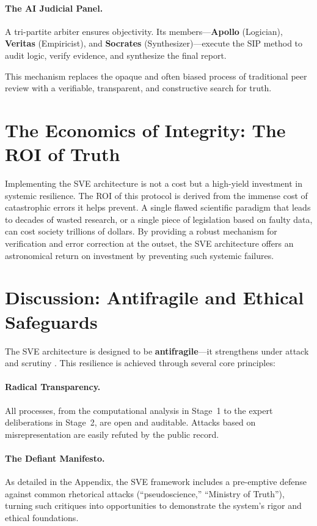 \documentclass[11pt,a4paper]{article}
\theoremstyle{definition}
\begin{document}
\paragraph{The AI Judicial Panel.} A tri-partite arbiter ensures objectivity. Its members---\textbf{Apollo} (Logician), \textbf{Veritas} (Empiricist), and \textbf{Socrates} (Synthesizer)---execute the SIP method to audit logic, verify evidence, and synthesize the final report.

This mechanism replaces the opaque and often biased process of traditional peer review with a verifiable, transparent, and constructive search for truth.

\section{The Economics of Integrity: The ROI of Truth}

Implementing the SVE architecture is not a cost but a high-yield investment in systemic resilience. The ROI of this protocol is derived from the immense cost of catastrophic errors it helps prevent. A single flawed scientific paradigm that leads to decades of wasted research, or a single piece of legislation based on faulty data, can cost society trillions of dollars. By providing a robust mechanism for verification and error correction at the outset, the SVE architecture offers an astronomical return on investment by preventing such systemic failures.

\section{Discussion: Antifragile and Ethical Safeguards}

The SVE architecture is designed to be \textbf{antifragile}---it strengthens under attack and scrutiny \citep{Taleb2012}. This resilience is achieved through several core principles:

\paragraph{Radical Transparency.} All processes, from the computational analysis in Stage~1 to the expert deliberations in Stage~2, are open and auditable. Attacks based on misrepresentation are easily refuted by the public record.

\paragraph{The Defiant Manifesto.} As detailed in the Appendix, the SVE framework includes a pre-emptive defense against common rhetorical attacks (``pseudoscience,'' ``Ministry of Truth''), turning such critiques into opportunities to demonstrate the system's rigor and ethical foundations.
\end{document}
